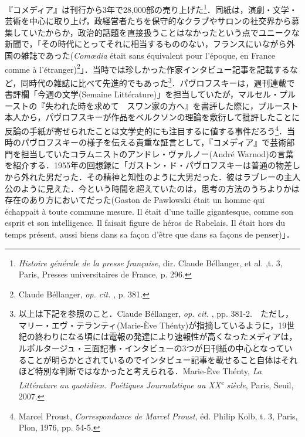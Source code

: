 『コメディア』は刊行から3年で28,000部の売り上げた\footnote{\emph{Histoire générale de la presse française}, dir. Claude Béllanger, et al. ,t. 3, Paris, Presses universitaires de France, p. 296.}．同紙は，演劇・文学・芸術を中心に取り上げ，政経営者たちを保守的なクラブやサロンの社交界から募集していたからか，政治的話題を直接扱うことはなかったという点でユニークな新聞で，「その時代にとってそれに相当するもののない，フランスにいながら外国の雑誌であった(\emph{Comœdia} était sans équivalent pour l'époque, en France comme à l'étranger)\footnote{Claude Béllanger, \emph{op. cit. }, p. 381.}」．当時では珍しかった作家インタビュー記事を記載するなど，同時代の雑誌に比べて先進的でもあった\footnote{以上は下記を参照のこと．Claude Béllanger, \emph{op. cit.} , pp. 381-2.　ただし，マリー・エヴ・テランティ(Marie-Ève Thénty)が指摘しているように，19世紀の終わりになる頃には電報の発達により速報性が高くなったメディアは，ルポルタージュ・三面記事・インタビューの3つが日刊紙の中心となっていることが明らかとされているのでインタビュー記事を載せること自体はそれほど特別な判断ではなかったと考えられる．Marie-Ève Thénty, \emph{La Littérature au quotidien. Poétiques Journalstique au XX\textsuperscript{e} siècle}, Paris, Seuil, 2007.}．パヴロフスキーは，週刊連載で書評欄「今週の文学(Semaine Littérature)」を担当していたが，マルセル・プルーストの『失われた時を求めて　スワン家の方へ』を書評した際に，プルースト本人から，パヴロフスキーが作品をベルクソンの理論を敷衍して批評したことに反論の手紙が寄せられたことは文学史的にも注目するに値する事件だろう\footnote{Marcel Proust, \emph{Correspondance de Marcel Proust}, éd. Philip Kolb, t. 3, Paris, Plon, 1976, pp. 54-5.}．当時のパヴロフスキーの様子を伝える貴重な証言として，『コメディア』で芸術部門を担当していたコラムニストのアンドレ・ヴァルノー(André Warnod)の言葉を紹介する．1955年の回想録に「ガストン・ド・パヴロフスキーは普通の物差しから外れた男だった．その精神と知性のように大男だった．彼はラブレーの主人公のように見えた．今という時間を超えていたのは，思考の方法のうちよりかは存在のあり方においてだった(Gaston de Pawlowski était un homme qui échappait à toute commune mesure. Il était d'une taille gigantesque, comme son esprit et son intelligence. Il faisait figure de héros de Rabelais. Il était hors du temps présent, aussi biens dans sa façon d'être que dans sa façons de penser)」．

